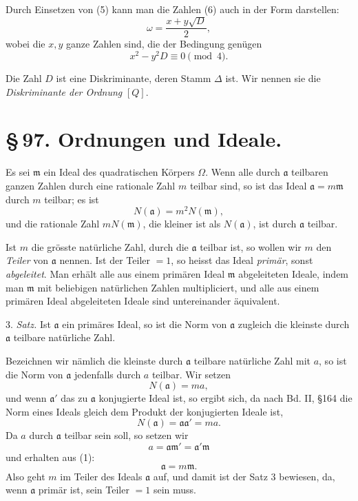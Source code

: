 \documentclass[11pt]{article}
\begin{document}
Durch Einsetzen von (5) kann man die Zahlen (6) auch in der Form darstellen:
\begin{equation}
 \omega=\frac{x+y\sqrt D}{2},
\tag{8}
\end{equation}
wobei die $x,y$ ganze Zahlen sind, die der Bedingung genügen
\begin{equation}
 x^2-y^2D\equiv0\pmod4.
\tag{9}
\end{equation}

Die Zahl $D$ ist eine Diskriminante, deren Stamm $\Delta$ ist. Wir nennen sie die \emph{Diskriminante der Ordnung} $[Q]$.


\section*{\S\,97. Ordnungen und Ideale.}

Es sei $\mathfrak m$ ein Ideal des quadratischen Körpers $\Omega$. Wenn alle durch $\mathfrak a$ teilbaren ganzen Zahlen durch eine rationale Zahl $m$ teilbar sind, so ist das Ideal $\mathfrak a=m\mathfrak m$ durch $m$ teilbar; es ist
\[
 N(\mathfrak a)=m^2N(\mathfrak m),
\]
und die rationale Zahl $mN(\mathfrak m)$, die kleiner ist als $N(\mathfrak a)$, ist durch $\mathfrak a$ teilbar.

Ist $m$ die grösste natürliche Zahl, durch die $\mathfrak a$ teilbar ist, so wollen wir $m$ den \emph{Teiler} von $\mathfrak a$ nennen. Ist der Teiler $=1$, so heisst das Ideal \emph{primär}, sonst \emph{abgeleitet}. Man erhält alle aus einem primären Ideal $\mathfrak m$ abgeleiteten Ideale, indem man $\mathfrak m$ mit beliebigen natürlichen Zahlen multipliciert, und alle aus einem primären Ideal abgeleiteten Ideale sind untereinander äquivalent.

3. \emph{Satz.} Ist $\mathfrak a$ ein primäres Ideal, so ist die Norm von $\mathfrak a$ zugleich die kleinste durch $\mathfrak a$ teilbare natürliche Zahl.

Bezeichnen wir nämlich die kleinste durch $\mathfrak a$ teilbare natürliche Zahl mit $a$, so ist die Norm von $\mathfrak a$ jedenfalls durch $a$ teilbar. Wir setzen
\[
 N(\mathfrak a)=ma,
\]
und wenn $\mathfrak a'$ das zu $\mathfrak a$ konjugierte Ideal ist, so ergibt sich, da nach Bd. II, \S 164 die Norm eines Ideals gleich dem Produkt der konjugierten Ideale ist,
\begin{equation}
 N(\mathfrak a)=\mathfrak a\mathfrak a'=ma.
\tag{1}
\end{equation}
Da $a$ durch $\mathfrak a$ teilbar sein soll, so setzen wir
\[
 a=\mathfrak a\mathfrak m'=\mathfrak a'\mathfrak m
\]
und erhalten aus (1):
\begin{equation}
 \mathfrak a=m\mathfrak m.
\tag{2}
\end{equation}
Also geht $m$ im Teiler des Ideals $\mathfrak a$ auf, und damit ist der Satz 3 bewiesen, da, wenn $\mathfrak a$ primär ist, sein Teiler $=1$ sein muss.
\end{document}
